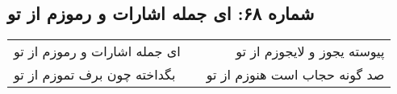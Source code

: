 \begin{center}
\section*{شماره ۶۸: ای جمله اشارات و رموزم از تو}
\label{sec:068}
\begin{longtable}{l p{0.5cm} r}
ای جمله اشارات و رموزم از تو
&&
پیوسته یجوز و لایجوزم از تو
\\
بگداخته چون برف تموزم از تو
&&
صد گونه حجاب است هنوزم از تو
\\
\end{longtable}
\end{center}
